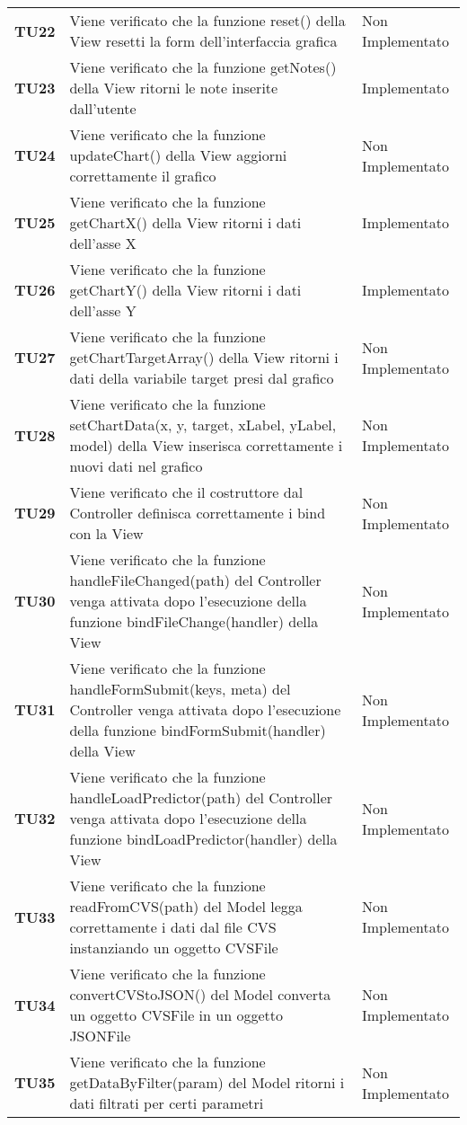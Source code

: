\documentclass[../piano-di-qualifica.tex]{subfiles}
\begin{document}
\begin{longtable}[H]{>{\centering\bfseries}m{2.5cm} >{\centering}m{7.5cm} >{\centering\arraybackslash}m{3.5cm}}
  \textbf{TU22} & Viene verificato che la funzione reset() della View resetti la form dell'interfaccia grafica & Non Implementato \\
  \textbf{TU23} & Viene verificato che la funzione getNotes() della View ritorni le note inserite dall'utente & Implementato \\
  \textbf{TU24} & Viene verificato che la funzione updateChart() della View aggiorni correttamente il grafico & Non Implementato \\
  \textbf{TU25} & Viene verificato che la funzione getChartX() della View ritorni i dati dell'asse X & Implementato \\
  \textbf{TU26} & Viene verificato che la funzione getChartY() della View ritorni i dati dell'asse Y & Implementato \\
  \textbf{TU27} & Viene verificato che la funzione getChartTargetArray() della View ritorni i dati della variabile target presi dal grafico & Non Implementato \\
  \textbf{TU28} & Viene verificato che la funzione setChartData(x, y, target, xLabel, yLabel, model) della View inserisca correttamente i nuovi dati nel grafico & Non Implementato \\
  \textbf{TU29} & Viene verificato che il costruttore dal Controller definisca correttamente i bind con la View & Non Implementato \\
  \textbf{TU30} & Viene verificato che la funzione handleFileChanged(path) del Controller venga attivata dopo l'esecuzione della funzione bindFileChange(handler) della View & Non Implementato \\
  \textbf{TU31} & Viene verificato che la funzione handleFormSubmit(keys, meta) del Controller venga attivata dopo l'esecuzione della funzione bindFormSubmit(handler) della View & Non Implementato \\
  \textbf{TU32} & Viene verificato che la funzione handleLoadPredictor(path) del Controller venga attivata dopo l'esecuzione della funzione bindLoadPredictor(handler) della View & Non Implementato \\
  \textbf{TU33} & Viene verificato che la funzione readFromCVS(path) del Model legga correttamente i dati dal file CVS instanziando un oggetto CVSFile & Non Implementato \\
  \textbf{TU34} & Viene verificato che la funzione convertCVStoJSON() del Model converta un oggetto CVSFile in un oggetto JSONFile & Non Implementato \\
  \textbf{TU35} & Viene verificato che la funzione getDataByFilter(param) del Model ritorni i dati filtrati per certi parametri & Non Implementato \\

\end{longtable}
\end{document}
